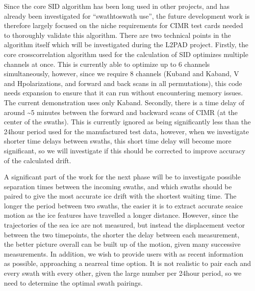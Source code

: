 \documentclass[letterpaper,10pt,english]{jupyterBook}
\begin{document}
\sphinxAtStartPar
Since the core SID algorithm has been long used in other projects, and has already been investigated for “swath\sphinxhyphen{}to\sphinxhyphen{}swath use”, the future development work is therefore largely focused on the niche requirements for CIMR test cards needed to thoroughly validate this algorithm. There are two technical points in the algorithm itself which will be investigated during the L2PAD project. Firstly, the core cross\sphinxhyphen{}correlation algorithm used for the calculation of SID optimizes multiple channels at once. This is currently able to optimize up to 6 channels simultaneously, however, since we require 8 channels (Ku\sphinxhyphen{}band and Ka\sphinxhyphen{}band, V and H\sphinxhyphen{}polarizations, and forward and back scans in all permutations), this code needs expansion to ensure that it can run without encountering memory issues. The current demonstration uses only Ka\sphinxhyphen{}band. Secondly, there is a time delay of around \textasciitilde{}5 minutes between the forward and backward scans of CIMR (at the center of the swaths). This is currently ignored as being significantly less than the 24\sphinxhyphen{}hour period used for the manufactured test data, however, when we investigate shorter time delays between swaths, this short time delay will become more significant, so we will investigate if this should be corrected to improve accuracy of the calculated drift.

\sphinxAtStartPar
A significant part of the work for the next phase will be to investigate possible separation times between the incoming swaths, and which swaths should be paired to give the most accurate ice drift with the shortest waiting time. The longer the period between two swaths, the easier it is to extract accurate sea\sphinxhyphen{}ice motion as the ice features have travelled a longer distance. However, since the trajectories of the sea ice are not measured, but instead the displacement vector between the two timepoints, the shorter the delay between each measurement, the better picture overall can be built up of the motion, given many successive measurements. In addition, we wish to provide users with as recent information as possible, approaching a near\sphinxhyphen{}real time option. It is not realistic to pair each and every swath with every other, given the large number per 24\sphinxhyphen{}hour period, so we need to determine the optimal swath pairings.
\end{document}
